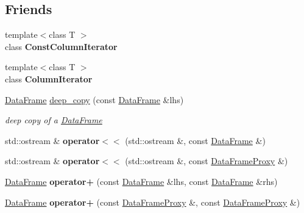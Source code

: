 \subsection*{Friends}
\begin{DoxyCompactItemize}
\item 
\mbox{\label{classDataFrame_a323c4435dd5a1b8a480b46dd8f16c77c}} 
{\footnotesize template$<$class T $>$ }\\class {\bfseries Const\+Column\+Iterator}
\item 
\mbox{\label{classDataFrame_a59406b6236833847c91e20e36a3983c9}} 
{\footnotesize template$<$class T $>$ }\\class {\bfseries Column\+Iterator}
\item 
\hyperlink{classDataFrame}{Data\+Frame} \hyperlink{classDataFrame_ac665e1df1c1d41e0d0c5afcdfb827a74}{deep\+\_\+copy} (const \hyperlink{classDataFrame}{Data\+Frame} \&lhs)
\begin{DoxyCompactList}\small\item\em deep copy of a \hyperlink{classDataFrame}{Data\+Frame} \end{DoxyCompactList}\item 
\mbox{\label{classDataFrame_a7372e1909f73624de2939188c8b407bd}} 
std\+::ostream \& {\bfseries operator$<$$<$} (std\+::ostream \&, const \hyperlink{classDataFrame}{Data\+Frame} \&)
\item 
\mbox{\label{classDataFrame_a178f043594e713eaa0bc4c427cfa7fcd}} 
std\+::ostream \& {\bfseries operator$<$$<$} (std\+::ostream \&, const \hyperlink{classDataFrame_1_1DataFrameProxy}{Data\+Frame\+Proxy} \&)
\item 
\mbox{\label{classDataFrame_a1b618c630383343b0476d4b2ee3892ba}} 
\hyperlink{classDataFrame}{Data\+Frame} {\bfseries operator+} (const \hyperlink{classDataFrame}{Data\+Frame} \&lhs, const \hyperlink{classDataFrame}{Data\+Frame} \&rhs)
\item 
\mbox{\label{classDataFrame_ac7252ac5b8145feb97ce0b16040cdbde}} 
\hyperlink{classDataFrame}{Data\+Frame} {\bfseries operator+} (const \hyperlink{classDataFrame_1_1DataFrameProxy}{Data\+Frame\+Proxy} \&, const \hyperlink{classDataFrame_1_1DataFrameProxy}{Data\+Frame\+Proxy} \&)

\end{DoxyCompactItemize}
